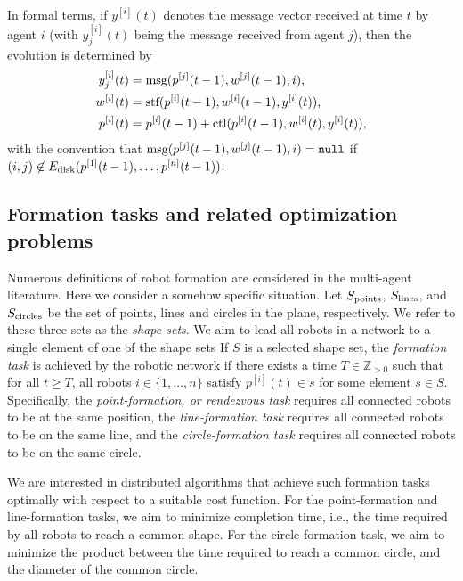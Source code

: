 \documentclass[onecolumn,journal,letterpaper]{IEEEtran}
\renewcommand{\natural}{{\mathbb{N}}}
\renewcommand{\natural}{{\mathbb{Z}_{>0}}}
\newcommand{\subscr}[2]{{#1}_{\textup{#2}}}
\newcommand{\until}[1]{\{1,\dots,#1\}}
\newcommand{\supind}[2]{{#1}^{[#2]}}
\newcommand{\nll}{\textup{\texttt{null}}\xspace}
\newcommand{\ctrl}{\textup{ctl}}
\newcommand{\msg}{\textup{msg}}
\newcommand{\stf}{\textup{stf}}
\begin{document}
In formal terms, if $\supind{y}{i}(t)$ denotes the message vector received
at time $t$ by agent $i$ (with $\supind{y}{i}_j(t)$ being the message
received from agent $j$), then the evolution is determined by
\begin{equation*}
  \begin{split}
    \supind{y}{i}_j(t) &= \msg(p^{[j]}(t-1),w^{[j]}(t-1),i),\\
\supind{w}{i}(t) &
    = \stf(p^{[i]}(t-1),\supind{w}{i}(t-1), y^{[i]}(t)), \\
p^{[i]}(t) &= p^{[i]}(t-1) +
    \ctrl(p^{[i]}(t-1), \supind{w}{i}(t), y^{[i]}(t)),
  \end{split}
\end{equation*}
with the convention that $\msg(p^{[j]}(t-1),w^{[j]}(t-1),i)=\nll$ if
$(i,j)\not\in \subscr{E}{disk}(p^{[1]}(t-1),\dots,p^{[n]}(t-1))$.


\subsection{Formation tasks and related optimization problems}
\label{sec:mintime-formation_optimal-formation}
Numerous definitions of robot formation are considered in the multi-agent
literature. Here we consider a somehow specific situation.  Let
$\subscr{S}{points}$, $\subscr{S}{lines}$, and $\subscr{S}{circles}$ be the
set of points, lines and circles in the plane, respectively. We refer to
these three sets as the \emph{shape sets}.  We aim to lead all robots in a
network to a single element of one of the shape sets If $S$ is a selected
shape set, the \emph{formation task} is achieved by the robotic network if
there exists a time $T\in\natural$ such that for all $t\geq T$, all robots
$i\in\until{n}$ satisfy $\supind{p}{i}(t) \in s$ for some element $s\in S$.
Specifically, the \emph{point-formation, or rendezvous task} requires all
connected robots to be at the same position, the \emph{line-formation task}
requires all connected robots to be on the same line, and the
\emph{circle-formation task} requires all connected robots to be on the
same circle.

We are interested in distributed algorithms that achieve such formation
tasks optimally with respect to a suitable cost function. For the
point-formation and line-formation tasks, we aim to minimize completion
time, i.e., the time required by all robots to reach a common shape.  For
the circle-formation task, we aim to minimize the product between the time
required to reach a common circle, and the diameter of the common circle.
\end{document}
